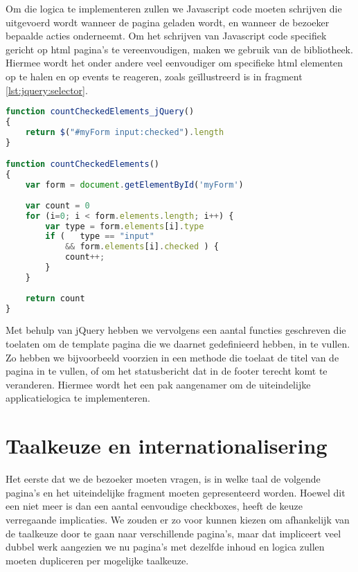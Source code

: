 Om die logica te implementeren zullen we Javascript code moeten schrijven die uitgevoerd wordt wanneer de pagina geladen wordt, en wanneer de bezoeker bepaalde acties onderneemt. Om het schrijven van Javascript code specifiek gericht op \ac{html} pagina's te vereenvoudigen, maken we gebruik van de  bibliotheek. Hiermee wordt het onder andere veel eenvoudiger om specifieke \ac{html} elementen op te halen en op events te reageren, zoals geïllustreerd is in fragment \ref{lst:jquery:selector}.
\begin{lstlisting}[language=Javascript, float, caption=Ophalen van een element met en zonder hulp van JQuery., label=lst:jquery:selector]
function countCheckedElements_jQuery()
{
	return $("#myForm input:checked").length
}

function countCheckedElements()
{
	var form = document.getElementById('myForm')
	
	var count = 0
	for (i=0; i < form.elements.length; i++) {
		var type = form.elements[i].type
		if (   type == "input"
		    && form.elements[i].checked ) {
			count++;
		}
	}
	
	return count
}
\end{lstlisting}

Met behulp van jQuery hebben we vervolgens een aantal functies geschreven die toelaten om de template pagina die we daarnet gedefinieerd hebben, in te vullen. Zo hebben we bijvoorbeeld voorzien in een  methode die toelaat de titel van de pagina in te vullen, of  om het statusbericht dat in de footer terecht komt te veranderen. Hiermee wordt het een pak aangenamer om de uiteindelijke applicatielogica te implementeren.

\section{Taalkeuze en internationalisering}

Het eerste dat we de bezoeker moeten vragen, is in welke taal de volgende pagina's en het uiteindelijke fragment moeten gepresenteerd worden. Hoewel dit een niet meer is dan een aantal eenvoudige checkboxes, heeft de keuze verregaande implicaties. We zouden er zo voor kunnen kiezen om afhankelijk van de taalkeuze door te gaan naar verschillende pagina's, maar dat impliceert veel dubbel werk aangezien we nu pagina's met dezelfde inhoud en logica zullen moeten dupliceren per mogelijke taalkeuze.

